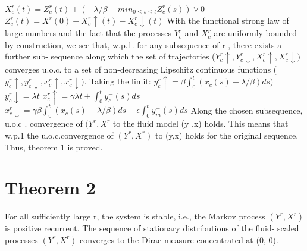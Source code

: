 \newline $X^r_c(t)=Z^r_c(t) + (- \lambda/ \beta - min_{0\leq s \leq t} Z^r_c (s)) \vee 0$
\newline $Z^r_c(t)= X^r(0) + X_c^r \uparrow(t) - X_c^r \downarrow(t)$
\newline\newline
With the functional strong law of large numbers and the fact that the processes $Y^r_c$ and $X^r_c $ are uniformly bounded by
construction, we see that, w.p.1. for any subsequence of r , there exists a further sub- sequence along which the set of trajectories ($Y^r_c\uparrow,Y^r_c\downarrow,X^r_c\uparrow,X^r_c\downarrow)$ converges u.o.c. to a set of non-decreasing Lipschitz continuous functions ($y^r_c\uparrow,y^r_c\downarrow,x^r_c\uparrow,x^r_c\downarrow)$. Taking the limit:
\newline
$y^r_c\uparrow= \beta \int_0^t(x_c(s) + \lambda/\beta) ds)$
\newline $y^r_c\downarrow=\lambda t$
\newline $x^r_c\uparrow= \gamma \lambda t + \int_0^t y_c^-(s)ds$
\newline $x^r_c\downarrow= \gamma \beta \int_0^t (x_c(s) +\lambda/\beta) ds + \epsilon \int_0^t y_m^+(s) ds$
\newline\newline
 Along the chosen subsequence, u.o.c . convergence of $(Y^r,X^r$ to the fluid model (y ,x) holds. This means that w.p.1 the u.o.c.convergence of $(Y^r,X^r)$ to (y,x) holds for the original sequence. Thus, theorem 1 is proved. 

 \newpage
 \section*{Theorem 2}
 For all sufficiently large r, the system is stable, i.e., the Markov process $(Y^r, X^r)$ is positive recurrent. The sequence of stationary distributions of the fluid- scaled processes $(Y^r , X^ r) $ converges to the Dirac measure concentrated at (0, 0).
 

